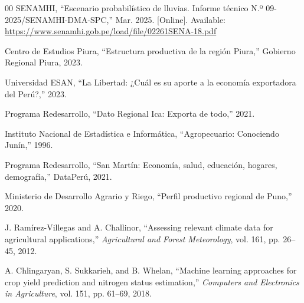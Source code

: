 \documentclass[conference]{IEEEtran}
\begin{document}
\begin{thebibliography}{00}
 SENAMHI, ``Escenario probabilístico de lluvias. Informe técnico N.º 09-2025/SENAMHI-DMA-SPC,'' Mar. 2025. [Online]. Available: \url{https://www.senamhi.gob.pe/load/file/02261SENA-18.pdf}

 Centro de Estudios Piura, ``Estructura productiva de la región Piura,'' Gobierno Regional Piura, 2023.

 Universidad ESAN, ``La Libertad: ¿Cuál es su aporte a la economía exportadora del Perú?,'' 2023.

 Programa Redesarrollo, ``Dato Regional Ica: Exporta de todo,'' 2021.

 Instituto Nacional de Estadística e Informática, ``Agropecuario: Conociendo Junín,'' 1996.

 Programa Redesarrollo, ``San Martín: Economía, salud, educación, hogares, demografía,'' DataPerú, 2021.

 Ministerio de Desarrollo Agrario y Riego, ``Perfil productivo regional de Puno,'' 2020.

 J. Ramírez-Villegas and A. Challinor, ``Assessing relevant climate data for agricultural applications,'' \textit{Agricultural and Forest Meteorology}, vol. 161, pp. 26--45, 2012.

 A. Chlingaryan, S. Sukkarieh, and B. Whelan, ``Machine learning approaches for crop yield prediction and nitrogen status estimation,'' \textit{Computers and Electronics in Agriculture}, vol. 151, pp. 61--69, 2018.

\end{thebibliography}
\end{document}
